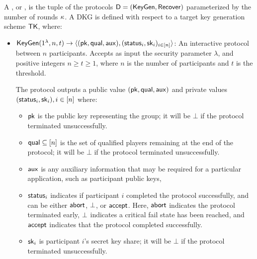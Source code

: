 \begin{definition}
  A , or ,
  is the tuple of the protocols $\mathsf{D} = (\mathsf{KeyGen}, \mathsf{Recover})$
  parameterized by the number of rounds $\kappa$.
  A DKG is defined with respect to a target key generation scheme $\mathsf{TK}$,
  where:

  \begin{itemize}
    \item $\mathsf{KeyGen}(1^\lambda, n, t) \rightarrow  \langle (\mathsf{pk}, \mathsf{qual}, \mathsf{aux}), (\mathsf{status}_i,\mathsf{sk}_i)_{i \in [n]}\rangle$:
      An interactive protocol between $n$ participants.
      Accepts as input the security parameter $\lambda$,
      and positive integers $n \geq t \geq 1$,
      where $n$ is the number of participants and $t$ is the threshold.

      The protocol outputs
      a public value $(\mathsf{pk}, \mathsf{qual}, \mathsf{aux})$
      and private values $(\mathsf{status}_i, \mathsf{sk}_i), i \in [n]$
      where:
      \begin{itemize}
        \item $\mathsf{pk}$ is the public key representing the group;
          it will be $\bot$ if the protocol terminated unsuccessfully.
        \item $\mathsf{qual} \subseteq [n]$ is the set of qualified players remaining at the end of the protocol;
          it will be $\bot$ if the protocol terminated unsuccessfully.
        \item $\mathsf{aux}$ is any auxiliary information that may be required for a particular application,
          such as participant public keys,
        \item $\mathsf{status}_i$ indicates if participant $i$ completed the protocol successfully,
      and can be either $\mathsf{abort}$, $\bot$, or $\mathsf{accept}$.
      Here, $\mathsf{abort}$ indicates the protocol terminated early,
      $\bot$ indicates a critical fail state has been reached,
      and $\mathsf{accept}$ indicates that the protocol completed successfully.
        \item $\mathsf{sk}_i$ is participant $i$'s secret key share;
          it will be $\bot$ if the protocol terminated unsuccessfully.
      \end{itemize}



\end{itemize}
\end{definition}
